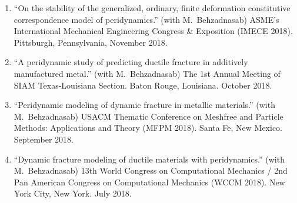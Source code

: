 \begin{enumerate}
  \item ``On the stability of the generalized, ordinary, finite deformation constitutive correspondence model of peridynamics.'' (with M.\ Behzadnasab) ASME's International Mechanical Engineering Congress \& Exposition (IMECE 2018). Pittsburgh, Pennsylvania, November 2018.
  \item ``A peridynamic study of predicting ductile fracture in additively manufactured metal.'' (with M.\ Behzadnasab) The 1st Annual Meeting of SIAM Texas-Louisiana Section. Baton Rouge, Louisiana. October 2018. 
  \item ``Peridynamic modeling of dynamic fracture in metallic materials.'' (with M.\ Behzadnasab) USACM Thematic Conference on Meshfree and Particle Methods: Applications and Theory (MFPM 2018). Santa Fe, New Mexico. September 2018.
  \item ``Dynamic fracture modeling of ductile materials with peridynamics.'' (with M.\ Behzadnasab) 13th World Congress on Computational Mechanics / 2nd Pan American Congress on Computational Mechanics (WCCM 2018). New York City, New York. July 2018.
\end{enumerate}
\else
\ifdefined\ispdf
